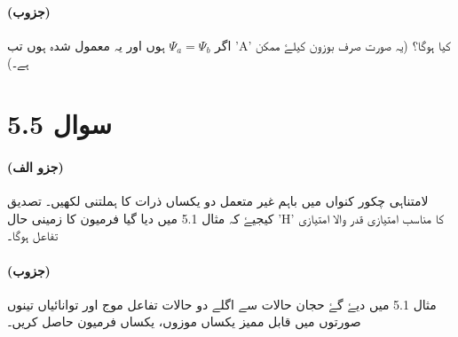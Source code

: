 \paragraph*{(جزوب)}
اگر  $ \Psi_{a} = \Psi_{b} $ ہوں اور یہ معمول شدہ ہوں تب 'A' کیا ہوگا؟ (یہ صورت صرف بوزون کیلۓ ممکن ہے۔)
\section*{سوال 5.5} 
\paragraph*{(جزو الف)}
لامتناہی چکور کنواں میں باہم غیر متعمل دو یکساں ذرات کا ہملتنی لکھیں۔ تصدیق کیجیۓ کہ مثال 5.1 میں دیا گیا فرمیون کا زمینی حال 'H' کا مناسب امتیازی قدر والا امتیازی تفاعل ہوگا۔ 
\paragraph*{(جزوب)}
مثال 5.1 میں دیۓ گۓ حجان حالات سے اگلے دو حالات تفاعل موج اور توانائیاں تینوں صورتوں میں قابل ممیز یکساں موزوں، یکساں فرمیون حاصل کریں۔


